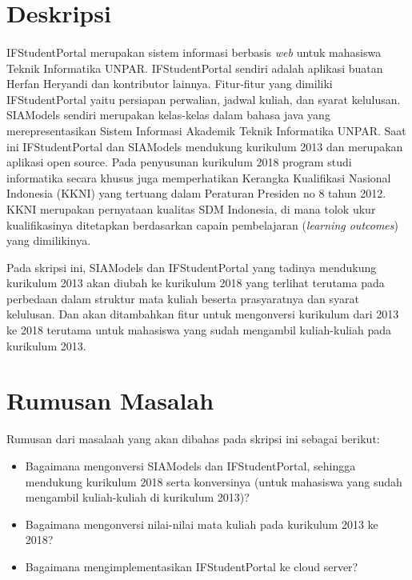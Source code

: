 \documentclass[a4paper,twoside]{article}
\begin{document}
\title{\@judultopik}
\author{\nama \textendash \@npm} 

\newcommand{\nama}{Andrianto Sugiarto}
\newcommand{\@npm}{2013730046}
\newcommand{\@judultopik}{Migrasi SIAModels dan IFStudentPortal ke Kurikulum 2018} %
\newcommand{\jumpemb}{1} %
\newcommand{\tanggal}{26/01/2018}
\maketitle


\section{Deskripsi}

\paragraph{} IFStudentPortal merupakan sistem informasi berbasis \textit{web} untuk mahasiswa Teknik Informatika UNPAR. IFStudentPortal sendiri adalah aplikasi buatan Herfan Heryandi dan kontributor lainnya. Fitur-fitur yang dimiliki IFStudentPortal yaitu persiapan perwalian, jadwal kuliah, dan syarat kelulusan. SIAModels sendiri merupakan kelas-kelas dalam bahasa java yang merepresentasikan Sistem Informasi Akademik Teknik Informatika UNPAR. Saat ini IFStudentPortal dan SIAModels mendukung kurikulum 2013 dan merupakan aplikasi open source. Pada penyusunan kurikulum 2018 program studi informatika secara khusus juga memperhatikan Kerangka Kualifikasi Nasional Indonesia (KKNI) yang tertuang dalam Peraturan Presiden no 8 tahun 2012. KKNI merupakan pernyataan kualitas SDM Indonesia, di mana tolok ukur kualifikasinya ditetapkan berdasarkan capain pembelajaran (\textit{learning outcomes}) yang dimilikinya.

Pada skripsi ini, SIAModels dan IFStudentPortal yang tadinya mendukung kurikulum 2013 akan diubah ke kurikulum 2018 yang terlihat terutama pada perbedaan dalam struktur mata kuliah beserta prasyaratnya dan syarat kelulusan. Dan akan ditambahkan fitur untuk mengonversi kurikulum dari 2013 ke 2018 terutama untuk mahasiswa yang sudah mengambil kuliah-kuliah pada kurikulum 2013.


\section{Rumusan Masalah}
Rumusan dari masalaah yang akan dibahas pada skripsi ini sebagai berikut:
\begin{itemize}
	\item Bagaimana mengonversi SIAModels dan IFStudentPortal, sehingga mendukung kurikulum 2018 serta konversinya (untuk mahasiswa yang sudah mengambil kuliah-kuliah di kurikulum 2013)?
	\item Bagaimana mengonversi nilai-nilai mata kuliah pada kurikulum 2013 ke 2018?
	\item Bagaimana mengimplementasikan IFStudentPortal ke cloud server?
\end{itemize}
\end{document}
